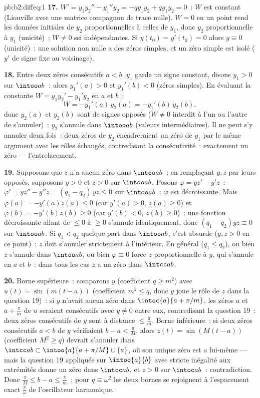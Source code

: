 \begin{solution}{pb:b2:diffeq:1}
\textbf{17.} $W' = y_1y_2'' - y_1''y_2 = -qy_1y_2 + qy_1y_2 =
0$~: $W$ est constant (Liouville avec une matrice compagnon de
trace nulle). $W = 0$ en un point rend les données initiales de
$y_2$ proportionnelles à celles de $y_1$, donc $y_2$ proportionnelle
à $y_1$ (unicité)~; $W \neq 0$ ssi indépendantes. Si $y(t_0) =
y'(t_0) = 0$ alors $y \equiv 0$ (unicité)~: une solution non nulle a
des zéros simples, et un zéro simple est isolé ($y'$ de signe fixe
au voisinage).

\textbf{18.} Entre deux zéros consécutifs $a < b$, $y_1$ garde
un signe constant, disons $y_1 > 0$ sur $\intoo ab$~: alors
$y_1'(a) > 0$ et $y_1'(b) < 0$ (zéros simples). En évaluant la
constante $W = y_1y_2' - y_1'y_2$ en $a$ et $b$~:
\[
W = -y_1'(a)\,y_2(a) = -y_1'(b)\,y_2(b) ,
\]
donc $y_2(a)$ et $y_2(b)$ sont de signes opposés ($W \neq 0$
interdit à l'un ou l'autre de s'annuler)~: $y_2$ s'annule dans
$\intoo ab$ (valeurs intermédiaires). Il ne peut s'y annuler deux
fois~: deux zéros de $y_2$ encadreraient un zéro de $y_1$ par le
même argument avec les rôles échangés, contredisant la
consécutivité~: exactement un zéro --- l'entrelacement.

\textbf{19.} Supposons que $z$ n'a aucun zéro dans $\intoo ab$~;
en remplaçant $y, z$ par leurs opposés, supposons $y > 0$ et $z >
0$ sur $\intoo ab$. Posons $\varphi = yz' - y'z$~: $\varphi' = yz''
- y''z = (q_1 - q_2)\,yz \leq 0$ sur $\intoo ab$~: $\varphi$ est
décroissante. Mais $\varphi(a) = -y'(a)z(a) \leq 0$ (car
$y'(a) > 0$, $z(a) \geq 0$) et $\varphi(b) = -y'(b)z(b) \geq
0$ (car $y'(b) < 0$, $z(b) \geq 0$)~: une fonction décroissante
allant de $\leq 0$ à $\geq 0$ s'annule identiquement, donc
$(q_1 - q_2)yz \equiv 0$ sur $\intoo ab$. Si $q_1 < q_2$
quelque part dans $\intoo ab$, c'est absurde ($y, z > 0$ en ce
point)~: $z$ doit s'annuler strictement à l'intérieur. En général
($q_1 \leq q_2$), ou bien $z$ s'annule dans $\intoo ab$, ou bien
$\varphi \equiv 0$ force $z$ proportionnelle à $y$, qui s'annule en
$a$ et $b$~: dans tous les cas $z$ a un zéro dans $\intcc ab$.

\textbf{20.} Borne supérieure~: comparons $y$ (coefficient $q \geq
m^2$) avec $u(t) = \sin(m(t - a))$ (coefficient $m^2 \leq q$,
donc $y$ joue le rôle de $z$ dans la question 19)~: si $y$ n'avait
aucun zéro dans $\intoc{a}{a + \pi/m}$, les zéros $a$ et $a +
\frac\pi m$ de $u$ seraient consécutifs avec $y \neq 0$
entre eux, contredisant la question 19~: deux zéros consécutifs de
$y$ sont à distance $\leq \frac\pi m$. Borne inférieure~: si deux
zéros consécutifs $a < b$ de $y$ vérifiaient $b - a < \frac\pi M$,
alors $z(t) = \sin(M(t-a))$ (coefficient $M^2 \geq q$) devrait
s'annuler dans $\intcc ab \subset \intoo{a}{a + \pi/M}
\cup\{a\}$, où son unique zéro est $a$ lui-même --- mais
la question 19 appliquée sur $\intoo{a}{b}$ avec stricte inégalité
aux extrémités donne un zéro dans $\intcc ab$, et $z > 0$ sur
$\intoc ab$~: contradiction. Donc $\frac\pi M \leq b - a \leq
\frac\pi m$~; pour $q \equiv \omega^2$ les deux bornes se rejoignent
à l'espacement exact $\frac\pi\omega$ de l'oscillateur
harmonique.


\end{solution}
